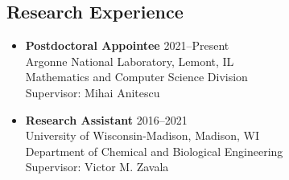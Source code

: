 \documentclass[letterpaper, 11pt]{article}
\begin{document}
\subsection*{Research Experience}
\begin{itemize}[leftmargin=*]
\item[] {\bf Postdoctoral Appointee} \hfill 2021--Present\\
  Argonne National Laboratory, Lemont, IL\\
  Mathematics and Computer Science Division \\
  Supervisor: Mihai Anitescu
\item[] {\bf Research Assistant} \hfill 2016--2021\\
  University of Wisconsin-Madison, Madison, WI\\
  Department of Chemical and Biological Engineering \\
  Supervisor: Victor M. Zavala

\end{itemize}
\end{document}
